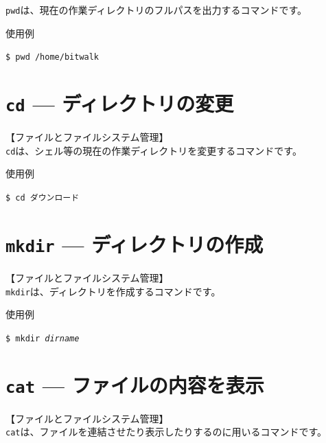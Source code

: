 \documentclass[a4j]{jreport}
\begin{document}
\texttt{pwd}は、現在の作業ディレクトリのフルパスを出力するコマンドです。\\

\begin{itembox}[l]{使用例}
	\begin{alltt}\texttt{\$ pwd
			/home/bitwalk}\end{alltt}
\end{itembox}

\section{\texttt{cd} --- ディレクトリの変更}

【ファイルとファイルシステム管理】\\

\texttt{cd}は、シェル等の現在の作業ディレクトリを変更するコマンドです。\\

\begin{itembox}[l]{使用例}
	\begin{alltt}\texttt{\$ cd ダウンロード}\end{alltt}
\end{itembox}

\section{\texttt{mkdir} --- ディレクトリの作成}

【ファイルとファイルシステム管理】\\

\texttt{mkdir}は、ディレクトリを作成するコマンドです。\\

\begin{itembox}[l]{使用例}
	\begin{alltt}\texttt{\$ mkdir \textit{dirname}}\end{alltt}
\end{itembox}

\section{\texttt{cat} --- ファイルの内容を表示}

【ファイルとファイルシステム管理】\\

\texttt{cat}は、ファイルを連結させたり表示したりするのに用いるコマンドです。\\
\end{document}
